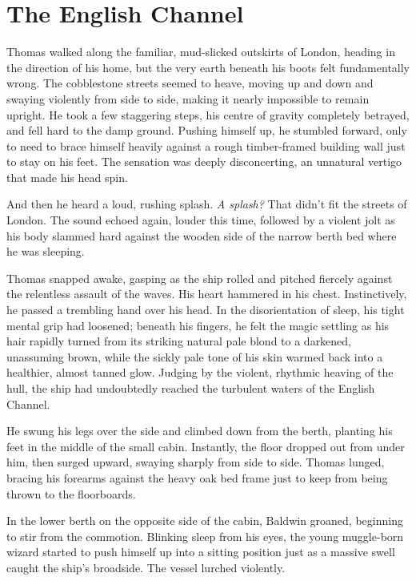 
\chapter{The English Channel}

Thomas walked along the familiar, mud-slicked outskirts of London, heading in the direction of his home, but the very earth beneath his boots felt fundamentally wrong. The cobblestone streets seemed to heave, moving up and down and swaying violently from side to side, making it nearly impossible to remain upright. He took a few staggering steps, his centre of gravity completely betrayed, and fell hard to the damp ground. Pushing himself up, he stumbled forward, only to need to brace himself heavily against a rough timber-framed building wall just to stay on his feet. The sensation was deeply disconcerting, an unnatural vertigo that made his head spin.

And then he heard a loud, rushing splash. \textit{A splash?} That didn't fit the streets of London. The sound echoed again, louder this time, followed by a violent jolt as his body slammed hard against the wooden side of the narrow berth bed where he was sleeping.

Thomas snapped awake, gasping as the ship rolled and pitched fiercely against the relentless assault of the waves. His heart hammered in his chest. Instinctively, he passed a trembling hand over his head. In the disorientation of sleep, his tight mental grip had loosened; beneath his fingers, he felt the magic settling as his hair rapidly turned from its striking natural pale blond to a darkened, unassuming brown, while the sickly pale tone of his skin warmed back into a healthier, almost tanned glow. Judging by the violent, rhythmic heaving of the hull, the ship had undoubtedly reached the turbulent waters of the English Channel.

He swung his legs over the side and climbed down from the berth, planting his feet in the middle of the small cabin. Instantly, the floor dropped out from under him, then surged upward, swaying sharply from side to side. Thomas lunged, bracing his forearms against the heavy oak bed frame just to keep from being thrown to the floorboards.

In the lower berth on the opposite side of the cabin, Baldwin groaned, beginning to stir from the commotion. Blinking sleep from his eyes, the young muggle-born wizard started to push himself up into a sitting position just as a massive swell caught the ship's broadside. The vessel lurched violently.


